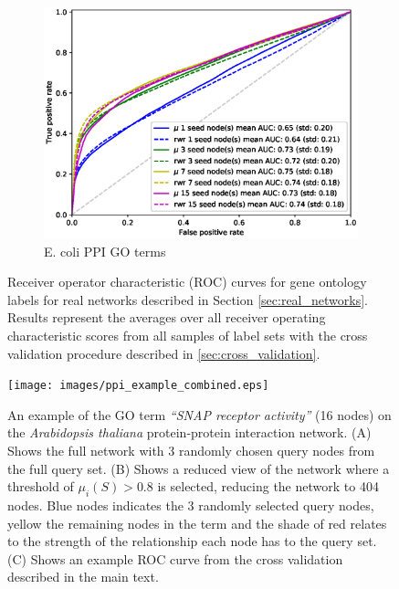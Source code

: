 \documentclass[sigconf]{acmart}
\begin{document}
\begin{figure}[]
\begin{subfigure}[b]{0.31\textwidth}
    \end{subfigure}
    \begin{subfigure}[b]{0.31\textwidth}
        \centering
        \includegraphics[width=\textwidth]{images/rocs/ecoli_ppi_amigo.eps}
        \caption{E. coli PPI GO terms}
    \end{subfigure}
    \caption{Receiver operator characteristic (ROC) curves for gene ontology labels for real networks described in Section \ref{sec:real_networks}. 
    Results represent the averages over all receiver operating characteristic scores from all samples of label sets with the cross validation procedure described in \ref{sec:cross_validation}.}
    \label{fig:GO_TERM_ROCS}
\end{figure}

\begin{figure}[t]
\texttt{[image: images/ppi\_example\_combined.eps]}
\caption{An example of the GO term \textit{``SNAP receptor activity''} (16 nodes) on the \textit{Arabidopsis thaliana} protein-protein interaction network.
(A) Shows the full network with 3 randomly chosen query nodes from the full query set.
(B) Shows a reduced view of the network where a threshold of $\mu_i(S) > 0.8$ is selected, reducing the network to 404 nodes.
Blue nodes indicates the 3 randomly selected query nodes, yellow the remaining nodes in the term and the shade of red relates to the strength of the relationship each node has to the query set.
(C) Shows an example ROC curve from the cross validation described in the main text.
}
\label{fig:query_example}
\end{figure}
\end{document}

